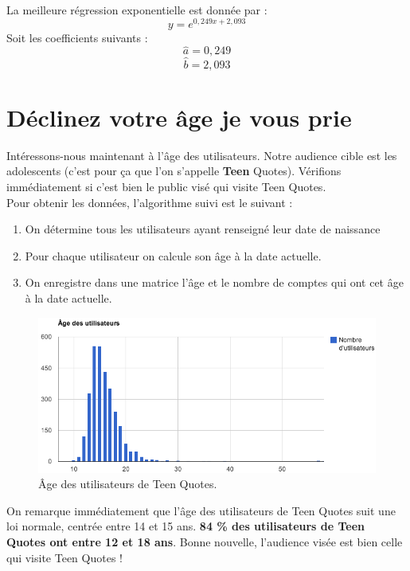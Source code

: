 \documentclass{report}
\begin{document}
	La meilleure régression exponentielle est donnée par :
	\[y = e^{0,249x + 2,093}\]
	Soit les coefficients suivants :
	\[\widehat{a} = 0,249\]
	\[\widehat{b} = 2,093\]

	\section{Déclinez votre âge je vous prie}
	Intéressons-nous maintenant à l'âge des utilisateurs. Notre audience cible est les adolescents (c'est pour ça que l'on s'appelle \textbf{Teen} Quotes). Vérifions immédiatement si c'est bien le public visé qui visite Teen Quotes.\\

	Pour obtenir les données, l'algorithme suivi est le suivant :
	\vspace{10px}
	\begin{enumerate}
		\item On détermine tous les utilisateurs ayant renseigné leur date de naissance
		\item Pour chaque utilisateur on calcule son âge à la date actuelle.
		\item On enregistre dans une matrice l'âge et le nombre de comptes qui ont cet âge à la date actuelle.
	\end{enumerate}
	\vspace{10px}
	\begin{figure}[H]
		\center
		\includegraphics[width=450px]{images/ageUtilisateurs.png}
		\caption{Âge des utilisateurs de Teen Quotes.}
	\end{figure}
	On remarque immédiatement que l'âge des utilisateurs de Teen Quotes suit une loi normale, centrée entre 14 et 15 ans. \textbf{84 \% des utilisateurs de Teen Quotes ont entre 12 et 18 ans}. Bonne nouvelle, l'audience visée est bien celle qui visite Teen Quotes !\\
\end{document}
